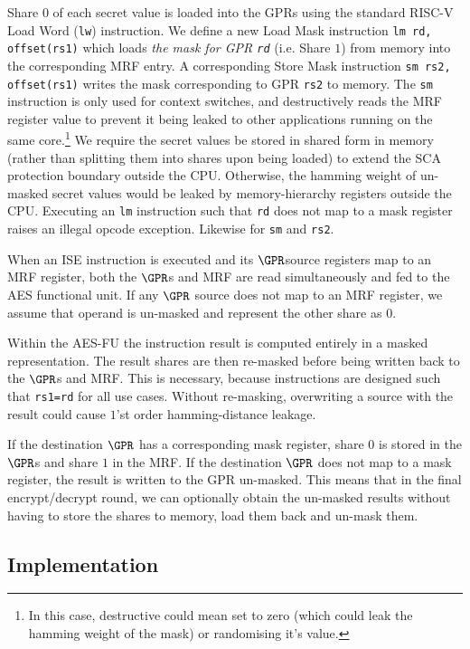 Share $0$ of each secret value is loaded into the GPRs using the
standard RISC-V Load Word ({\tt lw}) instruction.
We define a new Load Mask instruction {\tt lm rd, offset(rs1)} which
loads {\em the mask for GPR {\tt rd}}
(i.e. Share $1$)
from memory into the corresponding MRF entry.
A corresponding Store Mask instruction {\tt sm rs2, offset(rs1)} writes
the mask corresponding to GPR {\tt rs2} to memory.
The {\tt sm} instruction is only used for context switches, and
destructively reads the MRF register value to prevent it being
leaked to other applications running on the same core.\footnote{
    In this case, destructive could mean set to zero (which could
    leak the hamming weight of the mask) or randomising it's value.}
We require the secret values be stored in shared form in memory
(rather than splitting them into shares upon being loaded)
to extend the SCA protection boundary outside the CPU.
Otherwise, the hamming weight of un-masked secret values would be
leaked by memory-hierarchy registers outside the CPU.
Executing an {\tt lm} instruction such that {\tt rd} does not map to
a mask register raises an illegal opcode exception.
Likewise for {\tt sm} and {\tt rs2}.

When an ISE instruction is executed and its $\GPR$source
registers map to an MRF register, both the $\GPR$s and MRF are
read simultaneously and fed to the AES functional unit.
If any $\GPR$ source does not map to an MRF register, we assume that
operand is un-masked and represent the other share as $0$.

Within the AES-FU the instruction result is computed entirely in a
masked representation.
The result shares are then re-masked before being written back to the
$\GPR$s and MRF.
This is necessary, because  instructions are designed
such that {\tt rs1=rd} for all use cases.
Without re-masking, overwriting a source with the result could cause 
$1$'st order hamming-distance leakage.

If the destination $\GPR$ has a corresponding
mask register, share $0$ is stored in the $\GPR$s and share $1$ in the MRF.
If the destination $\GPR$ does not map to a mask register, the result is
written to the GPR un-masked.
This means that in the final encrypt/decrypt round, we can optionally obtain
the un-masked results without having to store the shares to memory,
load them back and un-mask them.

\subsection{Implementation}

